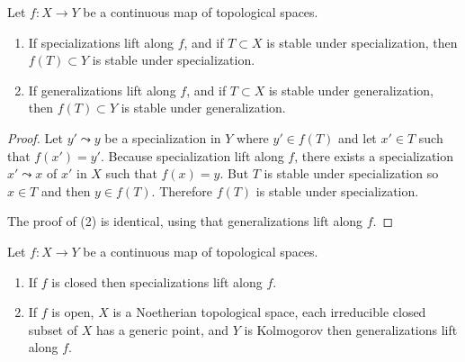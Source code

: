 \begin{lemma}
\label{lemma-lift-specializations-images}
Let $f : X \to Y$ be a continuous map of topological spaces.
\begin{enumerate}
\item If specializations lift along $f$, and if $T \subset X$
is stable under specialization, then $f(T) \subset Y$ is
stable under specialization.
\item If generalizations lift along $f$, and if $T \subset X$
is stable under generalization, then $f(T) \subset Y$ is
stable under generalization.
\end{enumerate}
\end{lemma}

\begin{proof}
Let $y' \leadsto y$ be a specialization in $Y$ where $y'\in f(T)$ and let
$x'\in T$ such that $f(x') = y'$. Because specialization lift along $f$, there
exists a specialization $x'\leadsto x$ of $x'$ in $X$ such that $f(x) = y$. But
$T$ is stable under specialization so $x\in T$ and then $y \in f(T)$. Therefore
$f(T)$ is stable under specialization.

\medskip\noindent
The proof of (2) is identical, using that generalizations lift along $f$.
\end{proof}

\begin{lemma}
\label{lemma-closed-open-map-specialization}
Let $f : X \to Y$ be a continuous map of topological spaces.
\begin{enumerate}
\item If $f$ is closed then specializations lift along $f$.
\item If $f$ is open, $X$ is a Noetherian topological space,
each irreducible closed subset of $X$ has a generic point,
and $Y$ is Kolmogorov then generalizations lift along $f$.
\end{enumerate}
\end{lemma}

